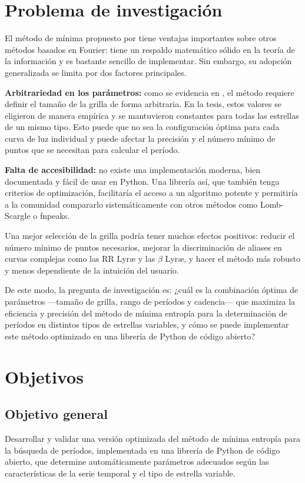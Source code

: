 \documentclass[12pt,letterpaper,oneside]{book}
\begin{document}
\chapter{Problema de investigación}
El método de mínima propuesto por \cite{cincotta1995astronomical} tiene ventajas importantes sobre otros métodos basados en Fourier: tiene un respaldo matemático sólido en la teoría de la información y es bastante sencillo de implementar. Sin embargo, su adopción generalizada se limita por dos factores principales. 

\textbf{Arbitrariedad en los parámetros:} como se evidencia en \cite{cubillos2021}, el método requiere definir el tamaño de la grilla de forma arbitraria. En la tesis, estos valores se eligieron de manera empírica y se mantuvieron constantes para todas las estrellas de un mismo tipo. Esto puede que no sea la configuración óptima para cada curva de luz individual y puede afectar la precisión y el número mínimo de puntos que se necesitan para calcular el período.

\textbf{Falta de accesibilidad:} no existe una implementación moderna, bien documentada y fácil de usar en Python. Una librería así, que también tenga criterios de optimización, facilitaría el acceso a un algoritmo potente y permitiría a la comunidad compararlo sistemáticamente con otros métodos como Lomb-Scargle o fnpeaks.

Una mejor selección de la grilla podría tener muchos efectos positivos: reducir el número mínimo de puntos necesarios, mejorar la discriminación de aliases en curvas complejas como las RR Lyr\ae{} y las $\beta$ Lyr\ae, y hacer el método más robusto y menos dependiente de la intuición del usuario.

De este modo, la pregunta de investigación es: ¿cuál es la combinación óptima de parámetros ---tamaño de grilla, rango de períodos y cadencia--- que maximiza la eficiencia y precisión del método de mínima entropía para la determinación de períodos en distintos tipos de estrellas variables, y cómo se puede implementar este método optimizado en una librería de Python de código abierto?

\chapter{Objetivos}
\section{Objetivo general}
Desarrollar y validar una versión optimizada del método de mínima entropía para la búsqueda de períodos, implementada en una librería de Python de código abierto, que determine automáticamente parámetros adecuados según las características de la serie temporal y el tipo de estrella variable.
\end{document}

